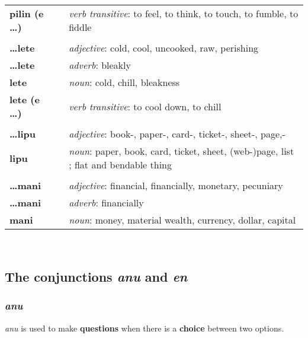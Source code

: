 \begin{supertabular}{p{2,5cm}|ll}
\textbf{pilin (e \dots)} && \textit{verb transitive}: to feel, to think, to touch, to fumble, to fiddle \\ %
 && \\ %
\textbf{\dots lete} && \textit{adjective}: cold, cool, uncooked, raw, perishing \\ %
\textbf{\dots lete} && \textit{adverb}: bleakly \\ %
\textbf{lete} && \textit{noun}: cold, chill, bleakness \\ %
\textbf{lete (e \dots)} && \textit{verb transitive}: to cool down, to chill \\ %
 && \\ %
\textbf{\dots lipu} && \textit{adjective}: book-, paper-, card-, ticket-, sheet-, page,- \\ %
\textbf{lipu} && \textit{noun}: paper, book, card, ticket, sheet, (web-)page, list ; flat and bendable thing \\ %
 && \\ %
\textbf{\dots mani} && \textit{adjective}: financial, financially, monetary, pecuniary \\ %
\textbf{\dots mani} && \textit{adverb}: financially \\ %
\textbf{mani} && \textit{noun}: money, material wealth, currency, dollar, capital \\ %
\end{supertabular} \\
% 
\subsection*{The conjunctions \textit{anu} and \textit{en}}
%
\subsubsection*{\textit{anu}}
%
\textit{anu} is used to make \textbf{questions} when there is a \textbf{choice} between two options. 

